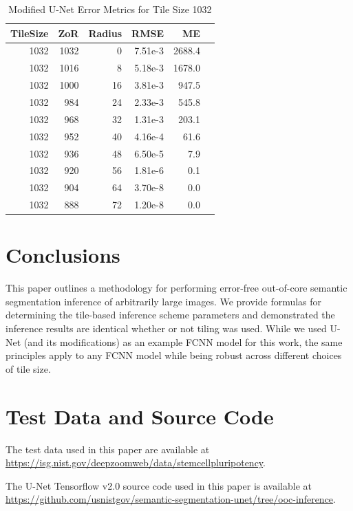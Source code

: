 \documentclass[letterpaper]{article} %
\begin{document}
\begin{table}[h!]
	\centering
		\caption{Modified U-Net Error Metrics for Tile Size 1032}
		\label{tab:tile_size_1032}
		\begin{tabular}{rrrrrr}
			TileSize & ZoR & Radius & RMSE    & ME \\ 
			\hline
1032 & 1032 & 0 & 7.51e-3  & 2688.4 \\
1032 & 1016 & 8 & 5.18e-3  & 1678.0 \\
1032 & 1000 & 16 & 3.81e-3 & 947.5 \\
1032 & 984 & 24 & 2.33e-3  & 545.8 \\
1032 & 968 & 32 & 1.31e-3  & 203.1 \\
1032 & 952 & 40 & 4.16e-4  & 61.6 \\
1032 & 936 & 48 & 6.50e-5  & 7.9 \\
1032 & 920 & 56 & 1.81e-6  & 0.1 \\
1032 & 904 & 64 & 3.70e-8  & 0.0 \\
1032 & 888 & 72 & 1.20e-8  & 0.0 \\
		\end{tabular}
\end{table}


\section{Conclusions}
\label{conclusion}

This paper outlines a methodology for performing error-free out-of-core semantic segmentation inference of arbitrarily large images. 
We provide formulas for determining the tile-based inference scheme parameters and demonstrated the inference results are identical whether or not tiling was used.
While we used U-Net (and its modifications) as an example FCNN model for this work, the same principles apply to any FCNN model while being robust across different choices of tile size. 


\section{Test Data and Source Code}
The test data used in this paper are available at 
\url{https://isg.nist.gov/deepzoomweb/data/stemcellpluripotency}. 

The U-Net Tensorflow v2.0 source code used in this paper is available at
\url{https://github.com/usnistgov/semantic-segmentation-unet/tree/ooc-inference}.
\end{document}
